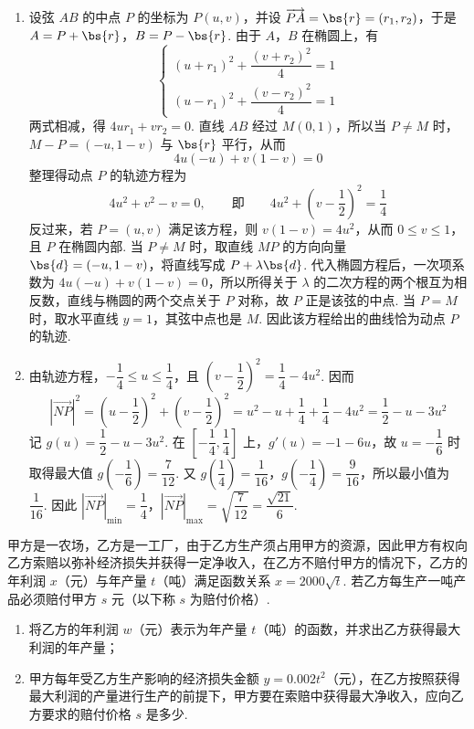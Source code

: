 \begin{solution}
\begin{enumerate}
\item 设弦 \(AB\) 的中点 \(P\) 的坐标为 \(P(u,v)\)，并设
\(\overrightarrow{PA}=\bs{r}=(r_1,r_2)\)，于是
\(A=P+\bs{r}\)，\(B=P-\bs{r}\). 由于 \(A\)，\(B\) 在椭圆上，有
\[
\begin{cases}
\left(u+r_1\right)^2+\dfrac{\left(v+r_2\right)^2}{4}=1\\
\left(u-r_1\right)^2+\dfrac{\left(v-r_2\right)^2}{4}=1
\end{cases}
\]
两式相减，得 \(4ur_1+vr_2=0\). 直线 \(AB\) 经过 \(M(0,1)\)，所以当 \(P\ne M\) 时，
\(M-P=(-u,1-v)\) 与 \(\bs{r}\) 平行，从而
\[
4u(-u)+v(1-v)=0
\]
整理得动点 \(P\) 的轨迹方程为
\[
4u^2+v^2-v=0,
\qquad\text{即}\qquad
4u^2+\left(v-\frac12\right)^2=\frac14
\]
反过来，若 \(P=(u,v)\) 满足该方程，则 \(v(1-v)=4u^2\)，从而 \(0\leq v\leq1\)，且 \(P\) 在椭圆内部. 当 \(P\ne M\) 时，取直线 \(MP\) 的方向向量 \(\bs{d}=(-u,1-v)\)，将直线写成
\(P+\lambda\bs{d}\). 代入椭圆方程后，一次项系数为
\(4u(-u)+v(1-v)=0\)，所以所得关于 \(\lambda\) 的二次方程的两个根互为相反数，直线与椭圆的两个交点关于 \(P\) 对称，故 \(P\) 正是该弦的中点. 当 \(P=M\) 时，取水平直线 \(y=1\)，其弦中点也是 \(M\). 因此该方程给出的曲线恰为动点 \(P\) 的轨迹.

\item 由轨迹方程，\(-\dfrac14\leq u\leq\dfrac14\)，且
\(\left(v-\dfrac12\right)^2=\dfrac14-4u^2\). 因而
\[
|\overrightarrow{NP}|^2=\left(u-\frac12\right)^2+\left(v-\frac12\right)^2
=u^2-u+\frac14+\frac14-4u^2
=\frac12-u-3u^2
\]
记 \(g(u)=\dfrac12-u-3u^2\). 在 \(\left[-\dfrac14,\dfrac14\right]\) 上，\(g'(u)=-1-6u\)，故 \(u=-\dfrac16\) 时取得最大值
\(g\left(-\dfrac16\right)=\dfrac7{12}\). 又
\(g\left(\dfrac14\right)=\dfrac1{16}\)，\(g\left(-\dfrac14\right)=\dfrac9{16}\)，所以最小值为 \(\dfrac1{16}\). 因此
\(|\overrightarrow{NP}|_{\min}=\dfrac14\)，\(|\overrightarrow{NP}|_{\max}=\sqrt{\dfrac7{12}}=\dfrac{\sqrt{21}}{6}\).
\end{enumerate}
\end{solution}

\begin{problem}
甲方是一农场，乙方是一工厂，由于乙方生产须占用甲方的资源，因此甲方有权向乙方索赔以弥补经济损失并获得一定净收入，在乙方不赔付甲方的情况下，乙方的年利润 \(x\)（元）与年产量 \(t\)（吨）满足函数关系 \(x = 2000\sqrt{t}\). 若乙方每生产一吨产品必须赔付甲方 \(s\) 元（以下称 \(s\) 为赔付价格）.

\begin{enumerate}
\item 将乙方的年利润 \(w\)（元）表示为年产量 \(t\)（吨）的函数，并求出乙方获得最大利润的年产量；
\item 甲方每年受乙方生产影响的经济损失金额 \(y = 0.002t^2\)（元），在乙方按照获得最大利润的产量进行生产的前提下，甲方要在索赔中获得最大净收入，应向乙方要求的赔付价格 \(s\) 是多少.
\end{enumerate}
\end{problem}

